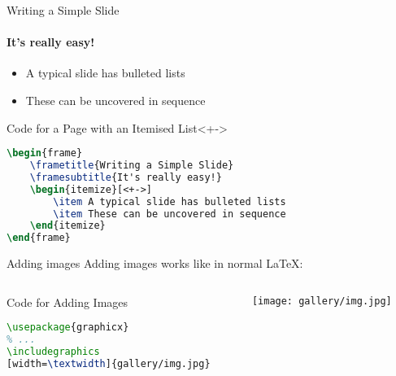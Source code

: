 \documentclass{beamer}
\begin{document}
    \begin{frame}[fragile]{Writing a Simple Slide}
        \framesubtitle{It's really easy!}
        \begin{itemize}[<+->]
            \item A typical slide has bulleted lists
            \item These can be uncovered in sequence
        \end{itemize}
        \begin{block}{Code for a Page with an Itemised List}<+->
            \begin{lstlisting}[language=TeX]
\begin{frame}
    \frametitle{Writing a Simple Slide}
    \framesubtitle{It's really easy!}
    \begin{itemize}[<+->]
        \item A typical slide has bulleted lists
        \item These can be uncovered in sequence
    \end{itemize}
\end{frame}\end{lstlisting}
        \end{block}
    \end{frame}

    \begin{frame}[fragile]{Adding images}
        Adding images works like in normal \LaTeX:
        \begin{columns}
            \begin{column}{0.7\textwidth}
                \begin{block}{Code for Adding Images}
                    \begin{lstlisting}[language=TeX]
\usepackage{graphicx}
% ...
\includegraphics
[width=\textwidth]{gallery/img.jpg}
                    \end{lstlisting}
                \end{block}
            \end{column}
            \begin{column}{0.3\textwidth}
                \vskip5pt\texttt{[image: gallery/img.jpg]}
            \end{column}
        \end{columns}
    \end{frame}
\end{document}
